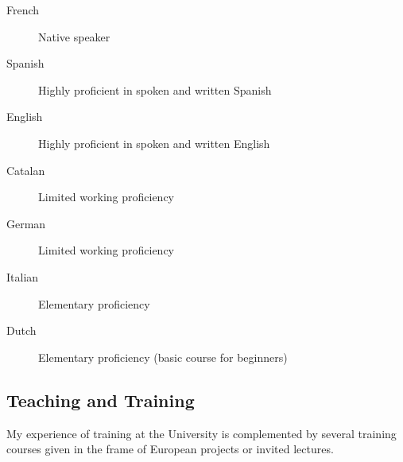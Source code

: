 \documentclass[11pt,a4paper,svgnames]{article}
\begin{document}
\begin{description}
\item[French] {Native speaker}
\item[Spanish] {Highly proficient in spoken and written Spanish}
\item[English] {Highly proficient in spoken and written English}
\item[Catalan] {Limited working proficiency}
\item[German] {Limited working proficiency}
\item[Italian] {Elementary proficiency}
\item[Dutch] {Elementary proficiency (basic course for beginners)}
\end{description}

\subsection{Teaching and Training}

\begin{summarybox}
My experience of training at the University is complemented by several training courses given in the frame of European projects or invited lectures.
\end{summarybox}
\end{document}
